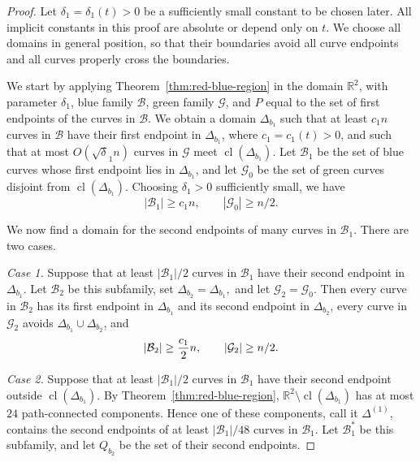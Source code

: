 \documentclass[11pt]{article}
\theoremstyle{plain}
\theoremstyle{definition}
\theoremstyle{remark}
\begin{document}
\begin{proof}
Let \(\delta_1=\delta_1(t)>0\) be a sufficiently small constant to be chosen later.
All implicit constants in this proof are absolute or depend only on \(t\). We
choose all domains in general position, so that their boundaries avoid all
curve endpoints and all curves properly cross the boundaries.

We start by applying Theorem~\ref{thm:red-blue-region} in the domain
\(\mathbb R^2\), with parameter \(\delta_1\), blue family \(\mathcal B\),
green family \(\mathcal G\), and \(P\) equal to the set of first endpoints
of the curves in \(\mathcal B\).  We obtain a domain \(\Delta_{b_1}\) such that at least
\(c_1n\) curves in \(\mathcal B\) have their first endpoint in
\(\Delta_{b_1}\), where \(c_1=c_1(t)>0\), and such that at most
\(O(\sqrt\delta_1 n)\) curves in \(\mathcal G\) meet
\(\operatorname{cl}(\Delta_{b_1})\). Let \(\mathcal B_1\) be the set of blue
curves whose first endpoint lies in \(\Delta_{b_1}\), and let
\(\mathcal G_0\) be the set of green curves disjoint from
\(\operatorname{cl}(\Delta_{b_1})\). Choosing \(\delta_1>0\) sufficiently
small, we have
\[
|\mathcal B_1|\ge c_1n,\qquad |\mathcal G_0|\ge n/2.
\]

We now find a domain for the second endpoints of many curves in
\(\mathcal B_1\). There are two cases.

\medskip
\noindent\emph{Case 1.}
Suppose that at least \(|\mathcal B_1|/2\) curves in \(\mathcal B_1\) have
their second endpoint in \(\Delta_{b_1}\). Let \(\mathcal B_2\) be this
subfamily, set $\Delta_{b_2}=\Delta_{b_1},$ and let \(\mathcal G_2=\mathcal G_0\). Then every curve in \(\mathcal B_2\)
has its first endpoint in \(\Delta_{b_1}\) and its second endpoint in
\(\Delta_{b_2}\), every curve in \(\mathcal G_2\) avoids
\(\Delta_{b_1}\cup\Delta_{b_2}\), and
\[
|\mathcal B_2|\ge {c_1\over 2}n,\qquad |\mathcal G_2|\ge n/2.
\]

\medskip
\noindent\emph{Case 2.}
Suppose that at least \(|\mathcal B_1|/2\) curves in \(\mathcal B_1\) have
their second endpoint outside \(\operatorname{cl}(\Delta_{b_1})\). By
Theorem~\ref{thm:red-blue-region}, $\mathbb R^2\setminus\operatorname{cl}(\Delta_{b_1})$ 
has at most \(24\) path-connected components. Hence one of these components,
call it \(\Delta^{(1)}\), contains the second endpoints of at least
\(|\mathcal B_1|/48\) curves in \(\mathcal B_1\). Let
\(\mathcal B_1^*\) be this subfamily, and let \(Q_{b_2}\) be the set of
their second endpoints.


\end{proof}
\end{document}
